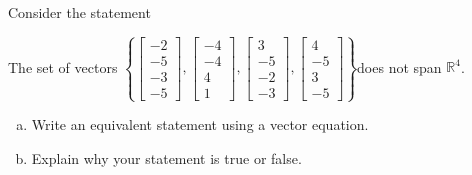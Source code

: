 
\begin{exerciseStatement}


Consider the statement 
\begin{center}\begin{minipage}{0.8\textwidth}
 The set of vectors \( \left\{ \left[\begin{array}{c}
-2 \\
-5 \\
-3 \\
-5
\end{array}\right] , \left[\begin{array}{c}
-4 \\
-4 \\
4 \\
1
\end{array}\right] , \left[\begin{array}{c}
3 \\
-5 \\
-2 \\
-3
\end{array}\right] , \left[\begin{array}{c}
4 \\
-5 \\
3 \\
-5
\end{array}\right] \right\} \)does not span \(\mathbb{R}^4\). 
\end{minipage}\end{center}
    


\begin{enumerate}[(a)]
\item  Write an equivalent statement using a vector equation.
\item  Explain why your statement is true or false.
\end{enumerate}
    
\end{exerciseStatement}
    
